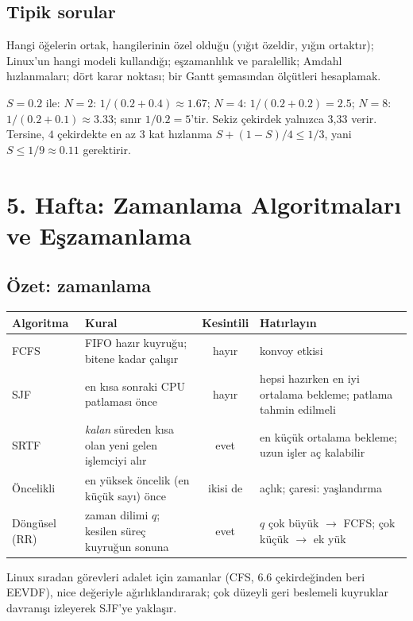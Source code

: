 \subsection*{Tipik sorular}
Hangi öğelerin ortak, hangilerinin özel olduğu (yığıt özeldir, yığın ortaktır); Linux'un hangi modeli kullandığı; eşzamanlılık ve paralellik; Amdahl hızlanmaları; dört karar noktası; bir Gantt şemasından ölçütleri hesaplamak.

\begin{example}
$S = 0.2$ ile: $N = 2$: $1/(0.2 + 0.4) \approx 1.67$; $N = 4$: $1/(0.2 + 0.2) = 2.5$; $N = 8$: $1/(0.2 + 0.1) \approx 3.33$; sınır $1/0.2 = 5$'tir. Sekiz çekirdek yalnızca 3,33 verir. Tersine, $4$ çekirdekte en az $3$ kat hızlanma $S + (1-S)/4 \le 1/3$, yani $S \le 1/9 \approx 0.11$ gerektirir.
\end{example}

\section{5. Hafta: Zamanlama Algoritmaları ve Eşzamanlama}
\label{sec:w5}
\subsection*{Özet: zamanlama}
\begin{center}
\renewcommand{\arraystretch}{1.25}
\begin{tabularx}{\linewidth}{@{}l >{\raggedright\arraybackslash}X c >{\raggedright\arraybackslash}X@{}}
\toprule
\textbf{Algoritma} & \textbf{Kural} & \textbf{Kesintili} & \textbf{Hatırlayın} \\
\midrule
FCFS & FIFO hazır kuyruğu; bitene kadar çalışır & hayır & konvoy etkisi \\
SJF & en kısa sonraki CPU patlaması önce & hayır & hepsi hazırken en iyi ortalama bekleme; patlama tahmin edilmeli \\
SRTF & \emph{kalan} süreden kısa olan yeni gelen işlemciyi alır & evet & en küçük ortalama bekleme; uzun işler aç kalabilir \\
Öncelikli & en yüksek öncelik (en küçük sayı) önce & ikisi de & açlık; çaresi: yaşlandırma \\
Döngüsel (RR) & zaman dilimi $q$; kesilen süreç kuyruğun sonuna & evet & $q$ çok büyük $\to$ FCFS; çok küçük $\to$ ek yük \\
\bottomrule
\end{tabularx}
\end{center}
Linux sıradan görevleri adalet için zamanlar (CFS, 6.6 çekirdeğinden beri EEVDF), nice değeriyle ağırlıklandırarak; çok düzeyli geri beslemeli kuyruklar davranışı izleyerek SJF'ye yaklaşır.

